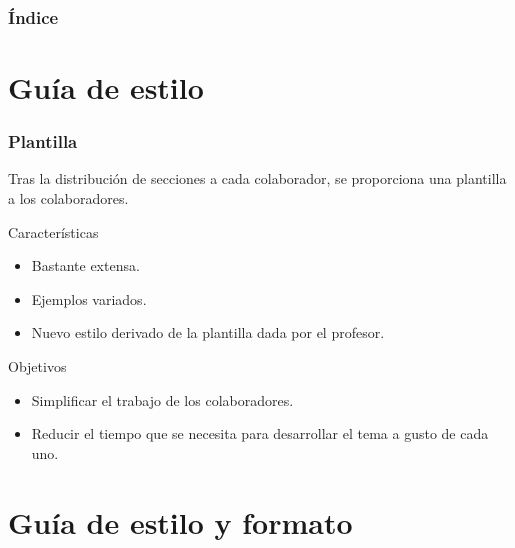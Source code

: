 \documentclass[9pt,xcolor=svgnames]{beamer}
\begin{document}
\begin{frame}
 \titlepage
\end{frame}


\normalsize


\begin{frame}
 \frametitle{Índice} 
 \transboxin
 \tableofcontents
\end{frame}
  
  
 \section{Guía de estilo}

 \begin{frame}
  \frametitle{Plantilla}

  \transdissolve
   Tras la distribución de secciones a cada colaborador, se proporciona una
   plantilla a los colaboradores.
  
  \begin{block}{Características}
    \begin{itemize}
    \item Bastante extensa.
    \item Ejemplos variados.
    \item Nuevo estilo derivado de la plantilla dada por el profesor.    
    \end{itemize}
  \end{block}
  
  \begin{block}{Objetivos}
  \begin{itemize}
    \item Simplificar el trabajo de los colaboradores.
    \item Reducir el tiempo que se necesita para desarrollar el tema a 
    gusto de cada uno.  
  \end{itemize}
  \end{block}
 
  \end{frame}
   
 
 \section{Guía de estilo y formato}
 
\end{document}
